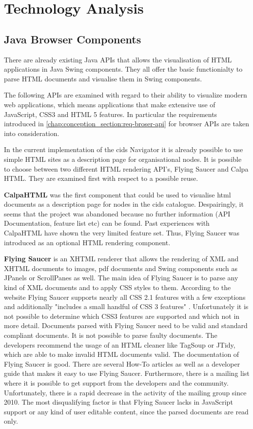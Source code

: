 \chapter{Technology Analysis}\label{chap:tech_analysis}
	
\section{Java Browser Components}\label{chap:browser_api_comparison}
There are already existing Java APIs that allows the visualisation of HTML applications in Java Swing components.
They all offer the basic functionialty to parse HTML documents and visualise them in Swing components.

The following APIs are examined with regard to their ability to visualize modern web applications, which means applications that make extensive use of JavaScript, CSS3 and HTML 5 features.
In particular the requirements introduced in \ref{chap:conception_section:req-broser-api} for browser APIs are taken into consideration.

In the current implementation of the cids Navigator it is already possible to use simple HTML sites as a description page for organisational nodes.
It is possible to choose  between two different HTML rendering API's, Flying Saucer and Calpa HTML.
They are examined first with respect to a possible reuse.
 

\textbf{CalpaHTML} was the first component that could be used to visualise html documents as a description page for nodes in the cids catalogue.
Despairingly, it seems that the project was abandoned because no further information (API Documentation, feature list etc) can be found. 
Past experiences with CalpaHTML have shown the very limited feature set.
Thus, Flying Saucer was introduced as an optional HTML rendering component.

\textbf{Flying Saucer} is an XHTML renderer that allows the rendering of XML and XHTML documents to images, pdf documents and Swing components such as JPanels or ScrollPanes as well.
The main idea of Flying Saucer is to parse any kind of XML documents and to apply CSS styles to them.
According to the website Flying Saucer supports nearly all CSS 2.1 features with a few exceptions and additionally "includes a small handful of CSS 3 features" \autocite{tech-ana:flying-saucer}.
Unfortunately it is not possible to determine which CSS3 features are supported and which not in more detail.
Documents parsed with Flying Saucer need to be valid and standard compliant documents.
It is not possible to parse faulty documents.
The developers recommend the usage of an HTML cleaner like TagSoup or JTidy, which are able to make invalid HTML documents valid.
The documentation of Flying Saucer is good.
There are several How-To articles as well as a developer guide that makes it easy to use Flying Saucer.
Furthermore, there is a mailing list where it is possible to get support from the developers and the community.
Unfortunately, there is a rapid decrease in the activity of the mailing group since 2010.
The most disqualifying factor is that Flying Saucer lacks in JavaScript support or any kind of user editable content, since the parsed documents are read only.

